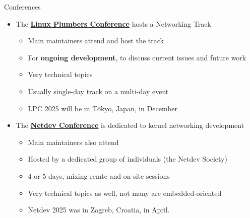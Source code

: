 \begin{frame}{Conferences}
	\begin{itemize}
		\item The \href{https://lpc.events/}{\textbf{Linux Plumbers Conference}} hosts a Networking Track
			\begin{itemize}
				\item Main maintainers attend and host the track
				\item For \textbf{ongoing development}, to discuss current issues and future work
				\item Very technical topics
				\item Usually single-day track on a multi-day event
				\item LPC 2025 will be in Tôkyo, Japan, in December
			\end{itemize}
		\item The \href{https://netdevconf.info/}{\textbf{Netdev Conference}} is dedicated to kernel networking development
			\begin{itemize}
				\item Main maintainers also attend
				\item Hosted by a dedicated group of individuals (the Netdev Society)
				\item 4 or 5 days, mixing remte and on-site sessions
				\item Very technical topics as well, not many are embedded-oriented
				\item Netdev 2025 was in Zagreb, Croatia, in April.
			\end{itemize}
	\end{itemize}
\end{frame}


